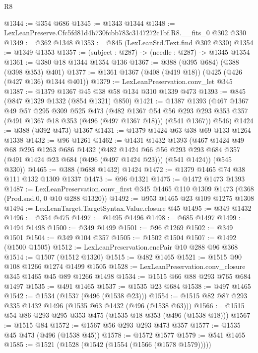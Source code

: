 \begin{lexlean}{R8}
\begin{coremodule}
@1344 := @354 @686
@1345 := @1343 @1344
@1348 := LexLeanPreserve.Cfc5fd81d4b730fcbb783c3147272c1bf.R8.__fits_0 @302 @330
@1349 := @362 @1348
@1353 := @845 (LexLeanStd.Text.find @302 @330)
@1354 := @1349 @1353
@1357 := (subject : @287) -> (needle : @287) -> @1345 @1354
@1361 := @380 @18 @1344 @1354 @136
@1367 := @388 (@395 @684) (@388 (@398 @353) @401)
@1377 := @1361 @1367 (@408 (@419 @18)) (@425 (@426 (@427 @136) @1344 @401))
@1379 := LexLeanPreservation.conv_let @345
@1387 := @1379 @1367 @45 @38 @58 @134 @310 @1339 @473
@1393 := @845 (@847 @1329 @1332 (@854 @1321) @850)
@1421 := @1387
    @1393
    (@467
      @1367
      @49
      @57
      @295
      @309
      @525
      @473
      (@482
        @1367
        @54
        @56
        @293
        @293
        @353
        @357
        (@491 @1367 @18 @353 (@496 (@497 @1367 @18)))
        (@541 @1367))
      @546)
@1424 := @388 (@392 @473) @1367
@1431 := @1379 @1424 @63 @38 @69 @133 @1264 @1338
@1432 := @96 @1261
@1462 := @1431
    @1432
    @1393
    (@467
      @1424
      @49
      @68
      @295
      @1263
      @686
      @1432
      (@482
        @1424
        @66
        @56
        @293
        @293
        @684
        @357
        (@491 @1424 @23 @684 (@496 (@497 @1424 @23)))
        (@541 @1424))
      (@545 @330))
@1465 := @388 (@688 @1432) @1424
@1472 := @1379 @1465 @74 @38 @111 @132 @1309 @1337
@1473 := @96 @1321
@1475 := @1472 @1473 @1393
@1487 := LexLeanPreservation.conv_first
    @345
    @1465
    @110
    @1309
    @1473
    (@368 (Prod.snd.{0, 0} @10 @288 @1320))
@1492 := @953 @1465 @23 @109 @1275 @1308
@1494 := LexLeanTarget.TargetSyntax.Value.closure @45
@1495 := @349 @1432
@1496 := @354 @475
@1497 := @1495 @1496
@1498 := @685 @1497
@1499 := @1494 @1498
@1500 := @349 @1499
@1501 := @96 @1269
@1502 := @349 @1501
@1504 := @349 @104 @357
@1505 := @1502 @1504
@1507 := @1492 (@1500 @1505)
@1512 := LexLeanPreservation.encPair @10 @288 @96 @368
@1514 := @1507 (@1512 @1320)
@1515 := @482 @1465
@1521 := @1515 @90 @108 @1266 @1274 @1499 @1505
@1528 := LexLeanPreservation.conv_closure @345 @1465 @45 @89 @1266 @1498
@1534 := @1515 @66 @88 @293 @765 @684 @1497
@1535 := @491 @1465
@1537 := @1535 @23 @684
@1538 := @497 @1465
@1542 := @1534 (@1537 (@496 (@1538 @23)))
@1554 := @1515 @82 @87 @293 @335 @1432 @1496 (@1535 @63 @1432 (@496 (@1538 @63)))
@1566 := @1515 @54 @86 @293 @295 @353 @475 (@1535 @18 @353 (@496 (@1538 @18)))
@1567 := @1515 @84
@1572 := @1567 @56 @293 @293 @473 @357
@1577 := @1535 @45 @473 (@496 (@1538 @45))
@1578 := @1572 @1577
@1579 := @541 @1465
@1585 := @1521 (@1528 (@1542 (@1554 (@1566 (@1578 @1579)))))

\end{coremodule}
\end{lexlean}
